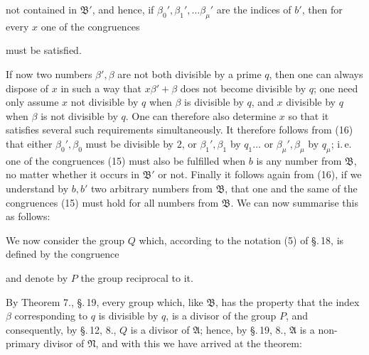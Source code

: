 
not contained in $\mathfrak{B}'$, and hence, if $\beta_0', \beta_1', \dots \beta_\mu'$ are the
indices of $b'$, then for every $x$ one of the congruences


must be satisfied.

If now two numbers $\beta', \beta$ are not both divisible by a prime $q$, then one can always dispose of $x$ in such a way that $x\beta' + \beta$ does not become divisible by $q$; one need only assume $x$ not divisible by $q$ when $\beta$ is divisible by $q$, and $x$ divisible by $q$ when $\beta$ is not divisible by $q$. One can therefore also determine $x$ so that it satisfies several such requirements simultaneously. It therefore follows from (16) that either $\beta_0', \beta_0$ must be divisible by $2$, or $\beta_1', \beta_1$ by $q_1 \dots$ or $\beta_\mu', \beta_\mu$ by $q_\mu$; i.\,e. one of the congruences (15) must also be fulfilled when $b$ is any number from $\mathfrak{B}$, no matter whether it occurs in $\mathfrak{B}'$ or not. Finally it follows again from (16), if we understand by $b, b'$ two arbitrary numbers from $\mathfrak{B}$, that one and the same of the congruences (15) must hold for all numbers from $\mathfrak{B}$. We can now summarise this as follows:


We now consider the group $Q$ which, according to the notation (5) of \S.\,18, is defined by the congruence


and denote by $P$ the group reciprocal to it.

By Theorem 7., \S.\,19, every group which, like $\mathfrak{B}$, has the property that the index $\beta$ corresponding to $q$ is divisible by $q$, is a divisor of the group $P$, and consequently, by \S.\,12, 8., $Q$ is a divisor of $\mathfrak{A}$; hence, by \S.\,19, 8., $\mathfrak{A}$ is a non-primary divisor of $\mathfrak{N}$, and with this we have arrived at the theorem:

